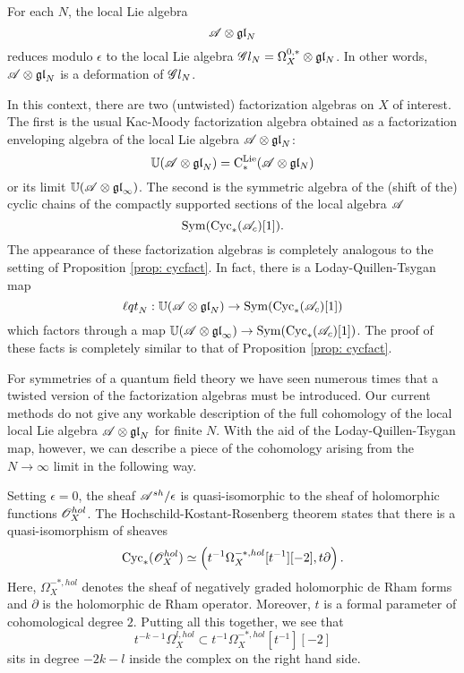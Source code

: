 For each $N$, the local Lie algebra 
\[
\mathscr A \otimes {\mathfrak{gl}}_N
\]
reduces modulo $\epsilon$ to the local Lie algebra $\mathscr G l_N = \Omega^{0,*}_X \otimes \mathfrak{g} \mathfrak{l}_N$.
In other words, $\mathscr A \otimes {\mathfrak{gl}}_N$ is a deformation of $\mathscr G l_N$. 

In this context, there are two (untwisted) factorization algebras on $X$ of interest. 
The first is the usual Kac-Moody factorization algebra obtained as a factorization enveloping algebra of the local Lie algebra $\mathscr A \otimes {\mathfrak{gl}}_N$:
\[
\mathbb U(\mathscr A \otimes {\mathfrak{gl}}_N) = {\rm C}^{\rm Lie}_*(\mathscr A \otimes \mathfrak{g} \mathfrak{l}_N)
\]
or its limit $\mathbb U(\mathscr A \otimes {\mathfrak{gl}}_\infty)$.
The second is the symmetric algebra of the (shift of the) cyclic chains of the compactly supported sections of the local algebra $\mathscr A$
\[
{\rm Sym}({\rm Cyc}_*(\mathscr A_c)[1]) .
\]
The appearance of these factorization algebras is completely analogous to the setting of Proposition \ref{prop: cycfact}.
In fact, there is a Loday-Quillen-Tsygan map
\[
{\ell q t}_N: \mathbb U (\mathscr A \otimes {\mathfrak{gl}}_N) \to {\rm Sym}({\rm Cyc}_*(\mathscr A_c)[1])
\]
which factors through a map $\mathbb U (\mathscr A \otimes {\mathfrak{gl}}_\infty) \to {\rm Sym}({\rm Cyc}_*(\mathscr A_c)[1])$. 
The proof of these facts is completely similar to that of Proposition \ref{prop: cycfact}. 

For symmetries of a quantum field theory we have seen numerous times that a twisted version of the factorization algebras must be introduced. 
Our current methods do not give any workable description of the full cohomology of the local local Lie algebra $\mathscr A \otimes {\mathfrak{gl}}_N$ for finite $N$.
With the aid of the Loday-Quillen-Tsygan map, however, we can describe a piece of the cohomology arising from the $N\to \infty$ limit in the following way. 

Setting $\epsilon = 0$, the sheaf $\mathscr A^{sh} / \epsilon$ is quasi-isomorphic to the sheaf of holomorphic functions $\mathscr O^{hol}_X$. 
The Hochschild-Kostant-Rosenberg theorem states that there is a quasi-isomorphism of sheaves
\[
{\rm Cyc}_* (\mathscr O^{hol}_X) \simeq \left(t^{-1} \Omega^{-*,hol}_X [t^{-1}] [-2], t \partial\right) .
\]
Here, $\Omega^{-*,hol}_X$ denotes the sheaf of negatively graded holomorphic de Rham forms and $\partial$ is the holomorphic de Rham operator. 
Moreover, $t$ is a formal parameter of cohomological degree $2$. 
Putting all this together, we see that
\[
t^{-k-1} \Omega^{l,hol}_X \subset t^{-1} \Omega^{-*,hol}_X [t^{-1}] [-2]
\]
sits in degree $-2k - l$ inside the complex on the right hand side. 

